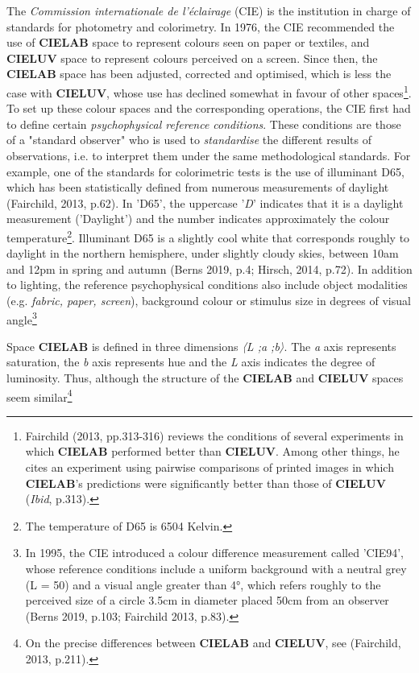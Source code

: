 \documentclass{article}
\begin{document}
The \textit{Commission internationale de l'éclairage} (CIE) is the institution in charge of standards for photometry and colorimetry. In 1976, the CIE recommended the use of \textbf{CIELAB} space to represent colours seen on paper or textiles, and \textbf{CIELUV} space to represent colours perceived on a screen. Since then, the \textbf{CIELAB} space has been adjusted, corrected and optimised, which is less the case with \textbf{CIELUV}, whose use has declined somewhat in favour of other spaces\footnote{Fairchild (2013, pp.313-316) reviews the conditions of several experiments in which \textbf{CIELAB} performed better than \textbf{CIELUV}. Among other things, he cites an experiment using pairwise comparisons of printed images in which \textbf{CIELAB}'s predictions were significantly better than those of \textbf{CIELUV} (\textit{Ibid}, p.313).}. To set up these colour spaces and the corresponding operations, the CIE first had to define certain \textit{psychophysical reference conditions}. These conditions are those of a "standard observer" who is used to \textit{standardise} the different results of observations, i.e. to interpret them under the same methodological standards. For example, one of the standards for colorimetric tests is the use of illuminant D65, which has been statistically defined from numerous measurements of daylight (Fairchild, 2013, p.62). In 'D65', the uppercase '\textit{D}' indicates that it is a daylight measurement ('Daylight') and the number indicates approximately the colour temperature\footnote{The temperature of D65 is 6504 Kelvin.}. Illuminant D65 is a slightly cool white that corresponds roughly to daylight in the northern hemisphere, under slightly cloudy skies, between 10am and 12pm in spring and autumn (Berns 2019, p.4; Hirsch, 2014, p.72). In addition to lighting, the reference  psychophysical conditions also include object modalities (e.g. \textit{fabric, paper, screen}), background colour or stimulus size in degrees of visual angle\footnote{In 1995, the CIE introduced a colour difference measurement called 'CIE94', whose reference conditions include a uniform background with a neutral grey (L = 50) and a visual angle greater than 4°, which refers roughly to the perceived size of a circle 3.5cm in diameter placed 50cm from an observer (Berns 2019, p.103; Fairchild 2013, p.83).}

Space \textbf{CIELAB} is defined in three dimensions \textit{〈L ;a ;b〉}. The \textit{a} axis represents saturation, the \textit{b} axis represents hue and the \textit{L} axis indicates the degree of luminosity. Thus, although the structure of the \textbf{CIELAB} and \textbf{CIELUV} spaces seem similar\footnote{On the precise differences between \textbf{CIELAB} and \textbf{CIELUV}, see (Fairchild, 2013, p.211).}





\end{document}
